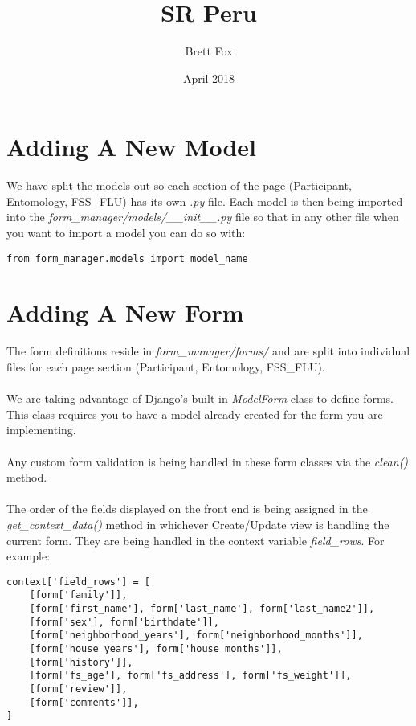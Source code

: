 \documentclass{article}
\title{SR Peru}
\author{ Brett Fox }
\date{April 2018}
\begin{document}
\maketitle

\newpage
\tableofcontents
\newpage

\section{Adding A New Model}
We have split the models out so each section of the page (Participant, Entomology, FSS\_FLU) has its own \textit{.py} file.  Each model is then being imported into the \textit{form\_manager/models/\_\_init\_\_.py} file so that in any other file when you want to import a model you can do so with:
\begin{verbatim}
from form_manager.models import model_name
\end{verbatim}

\section{Adding A New Form}
The form definitions reside in \textit{form\_manager/forms/} and are split into individual files for each page section (Participant, Entomology, FSS\_FLU). 
\\\\We are taking advantage of Django's built in \textit{ModelForm} class to define forms. This class requires you to have a model already created for the form you are implementing.
\\\\Any custom form validation is being handled in these form classes via the \textit{clean()} method.
\\\\The order of the fields displayed on the front end is being assigned in the \textit{get\_context\_data()} method in whichever Create/Update view is handling the current form.  They are being handled in the context variable \textit{field\_rows}.  For example:
\begin{verbatim}
context['field_rows'] = [
    [form['family']],
    [form['first_name'], form['last_name'], form['last_name2']],
    [form['sex'], form['birthdate']],
    [form['neighborhood_years'], form['neighborhood_months']],
    [form['house_years'], form['house_months']],
    [form['history']],
    [form['fs_age'], form['fs_address'], form['fs_weight']],
    [form['review']],
    [form['comments']],
]
\end{verbatim}
\end{document}

